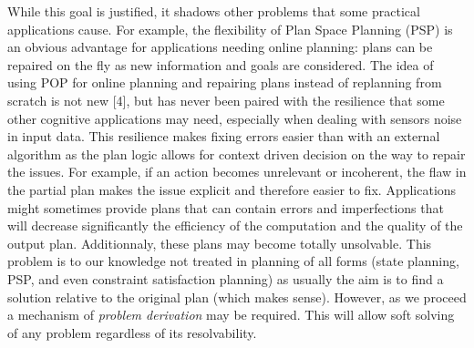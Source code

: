 \documentclass[]{article}
\begin{document}
While this goal is justified, it shadows other problems that some
practical applications cause. For example, the flexibility of Plan Space
Planning (PSP) is an obvious advantage for applications needing online
planning: plans can be repaired on the fly as new information and goals
are considered. The idea of using POP for online planning and repairing
plans instead of replanning from scratch is not new {[}4{]}, but has
never been paired with the resilience that some other cognitive
applications may need, especially when dealing with sensors noise in
input data. This resilience makes fixing errors easier than with an
external algorithm as the plan logic allows for context driven decision
on the way to repair the issues. For example, if an action becomes
unrelevant or incoherent, the flaw in the partial plan makes the issue
explicit and therefore easier to fix. Applications might sometimes
provide plans that can contain errors and imperfections that will
decrease significantly the efficiency of the computation and the quality
of the output plan. Additionnaly, these plans may become totally
unsolvable. This problem is to our knowledge not treated in planning of
all forms (state planning, PSP, and even constraint satisfaction
planning) as usually the aim is to find a solution relative to the
original plan (which makes sense). However, as we proceed a mechanism of
\emph{problem derivation} may be required. This will allow soft solving
of any problem regardless of its resolvability.
\end{document}

